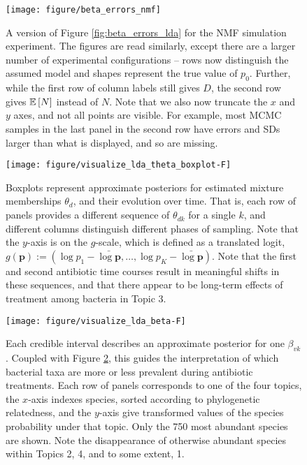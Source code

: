 \documentclass[oupdraft]{bio}
\begin{document}
{\begin{figure}[!p]
  \centering
  \texttt{[image: figure/beta\_errors\_nmf]}
  \caption{A version of Figure \ref{fig:beta_errors_lda} for the NMF simulation
    experiment. The figures are read similarly, except there are a larger number
    of experimental configurations -- rows now distinguish the assumed model and
    shapes represent the true value of $p_{0}$. Further, while the first row of
    column labels still gives $D$, the second row gives $\mathbb{E}\left[{N}\right]$ instead of
    $N$. Note that we also now truncate the $x$ and $y$ axes, and not all points
    are visible. For example, most MCMC samples in the last panel in the second
    row have errors and SDs larger than what is displayed, and so are
    missing. \label{fig:beta_errors_zinf}}
\end{figure}

\begin{figure}[!p]
  \centering\texttt{[image: figure/visualize\_lda\_theta\_boxplot-F]}
  \caption{Boxplots represent approximate posteriors for estimated mixture
    memberships $\theta_{d}$, and their evolution over time. That is, each row
    of panels provides a different sequence of $\theta_{dk}$ for a single $k$,
    and different columns distinguish different phases of sampling. Note that
    the $y$-axis is on the $g$-scale, which is defined as a translated logit,
    $g\left(\mathbf{p}\right) := \left(\log p_{1} - \bar{\log \mathbf{p}},
    \dots,\log p_{K} - \bar{\log \mathbf{p}}\right)$. Note that the first
    and second antibiotic time courses result in meaningful shifts in these
    sequences, and that there appear to be long-term effects of treatment among
    bacteria in Topic 3. \label{fig:antibiotics_lda_theta}}
\end{figure}

\begin{figure}[!p]
  \centering\texttt{[image: figure/visualize\_lda\_beta-F]}
  \caption{Each credible interval describes an approximate posterior for one
    $\beta_{vk}$. Coupled with Figure \ref{fig:antibiotics_lda_theta}, this
    guides the interpretation of which bacterial taxa are more or less prevalent
    during antibiotic treatments. Each row of panels corresponds to one of the
    four topics, the $x$-axis indexes species, sorted according to phylogenetic
    relatedness, and the $y$-axis give transformed values of the species probability
    under that topic. Only the 750 most abundant species are shown. Note the
    disappearance of otherwise abundant species within Topics 2, 4, and to some
    extent, 1.} \label{fig:antibiotics_lda_beta}
\end{figure}

}
\end{document}
